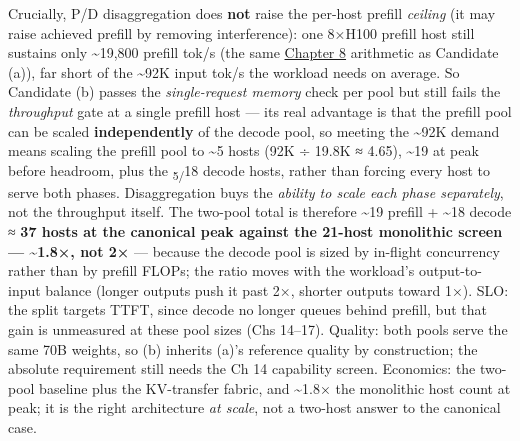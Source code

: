 Crucially, P/D disaggregation does \textbf{not} raise the per-host
prefill \emph{ceiling} (it may raise achieved prefill by removing
interference): one 8×H100 prefill host still sustains only
\textasciitilde19,800 prefill tok/s (the same \hyperref[chap:8]{Chapter 8} arithmetic as
Candidate (a)), far short of the \textasciitilde92K input tok/s the
workload needs on average. So Candidate (b) passes the
\emph{single-request memory} check per pool but still fails the
\emph{throughput} gate at a single prefill host --- its real advantage
is that the prefill pool can be scaled \textbf{independently} of the
decode pool, so meeting the \textasciitilde92K demand means scaling the
prefill pool to \textasciitilde5 hosts (92K ÷ 19.8K ≈ 4.65),
\textasciitilde19 at peak before headroom, plus the \textsubscript{5/}18
decode hosts, rather than forcing every host to serve both phases.
Disaggregation buys the \emph{ability to scale each phase separately},
not the throughput itself. The two-pool total is therefore
\textasciitilde19 prefill + \textasciitilde18 decode ≈ \textbf{37 hosts
at the canonical peak against the 21-host monolithic screen ---
\textasciitilde1.8×, not 2×} --- because the decode pool is sized by
in-flight concurrency rather than by prefill FLOPs; the ratio moves with
the workload's output-to-input balance (longer outputs push it past 2×,
shorter outputs toward 1×). SLO: the split targets TTFT, since decode no
longer queues behind prefill, but that gain is unmeasured at these pool
sizes (Chs 14--17). Quality: both pools serve the same 70B weights, so
(b) inherits (a)'s reference quality by construction; the absolute
requirement still needs the Ch 14 capability screen. Economics: the
two-pool baseline plus the KV-transfer fabric, and \textasciitilde1.8×
the monolithic host count at peak; it is the right architecture \emph{at
scale}, not a two-host answer to the canonical case.

